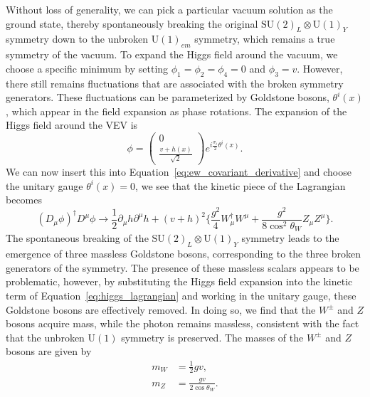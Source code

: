 Without loss of generality, we can pick a particular vacuum solution as the ground state, thereby spontaneously breaking the original $\mathrm{SU}{(2)}_{L} \otimes \mathrm{U}{(1)}_{Y}$ symmetry down to the unbroken $\mathrm{U}{(1)}_{em}$ symmetry, which remains a true symmetry of the vacuum. To expand the Higgs field around the vacuum, we choose a specific minimum by setting $\phi_{1}=\phi_{2}=\phi_{4} = 0$ and $\phi_{3} = v$. However, there still remains fluctuations that are associated with the broken symmetry generators. These fluctuations can be parameterized by Goldstone bosons, $\theta^{i}(x)$, which appear in the field expansion as phase rotations. The expansion of the Higgs field around the VEV is
\begin{equation}
  \phi = \begin{pmatrix}
    0 \\
    \frac{v + h(x)}{\sqrt{2}}
  \end{pmatrix} e^{i\frac{\sigma_{i}}{2}\theta^{i}(x)}.
  \label{eq:higgs_expansion}
\end{equation}
We can now insert this into Equation~\ref{eq:ew_covariant_derivative} and choose the unitary gauge $\theta^{i}(x) = 0$, we see that the kinetic piece of the Lagrangian becomes
\begin{equation}
  {(D_{\mu}\phi)}^{\dagger}D^{\mu}\phi \rightarrow \frac{1}{2}\partial_{\mu}h\partial^{\mu}h + {(v+h)}^{2}\{\frac{g^{2}}{4}W_{\mu}^{\dagger}W^{\mu} + \frac{g^{2}}{8\cos^2{\theta_{W}}}Z_{\mu}Z^{\mu}   \}.
\end{equation}
The spontaneous breaking of the $\mathrm{SU}{(2)}_{L} \otimes \mathrm{U}{(1)}_{Y}$ symmetry leads to the emergence of three massless Goldstone bosons, corresponding to the three broken generators of the symmetry. The presence of these massless scalars appears to be problematic, however, by substituting the Higgs field expansion into the kinetic term of Equation~\ref{eq:higgs_lagrangian} and working in the unitary gauge, these Goldstone bosons are effectively removed. In doing so, we find that the $W^\pm$ and $Z$ bosons acquire mass, while the photon remains massless, consistent with the fact that the unbroken $\mathrm{U}(1)$ symmetry is preserved. The masses of the $W^\pm$ and $Z$ bosons are given by
\begin{align}
  m_{W} &= \frac{1}{2}g v, \\
  m_{Z} &= \frac{gv}{2\cos{\theta_{W}}}.
  \label{eq:higgs_masses}
\end{align}

